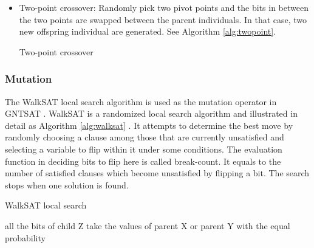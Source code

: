 \begin{itemize}
	\item
	      Two-point crossover: Randomly pick two pivot points and the bits in between
	      the two points are swapped between the parent individuals. In that case, two
	      new offspring individual are generated. See Algorithm \ref{alg:twopoint}.

	      \begin{algorithm}[t]
		      \SetAlgoLined
		      \caption{Two-point crossover}
		      \label{alg:twopoint}
		      \BlankLine
	      \end{algorithm}
\end{itemize}

\subsubsection{Mutation}
The WalkSAT local search algorithm is used as the mutation operator in GNTSAT
. WalkSAT is a randomized local search algorithm and illustrated in detail as
Algorithm \ref{alg:walksat} \parencite{biere2009handbook}. It attempts to
determine the best move by randomly choosing a clause among those that are
currently unsatisfied and selecting a variable to flip within it under some
conditions. The evaluation function in deciding bits to flip here is called
break-count. It equals to the number of satisfied clauses which become
unsatisfied by flipping a bit. The search stops when one solution is found.

\begin{algorithm*}[t]
	\SetAlgoLined
	\caption{WalkSAT local search}
	\label{alg:walksat}
	\BlankLine
	all the bits of child Z take the values of parent X or parent Y with the equal
	probability\; 
\end{algorithm*}

